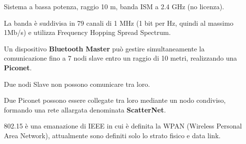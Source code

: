         Sistema a bassa potenza, raggio 10 m, banda ISM a 2.4 GHz (no licenza).

        La banda è suddivisa in 79 canali di 1 MHz (1 bit per Hz, quindi al massimo 1Mb/s) e utilizza Frequency Hopping Spread Spectrum.
        
        Un dispositivo \textbf{Bluetooth Master} può gestire simultaneamente la comunicazione fino a 7 nodi slave entro un raggio di 10 metri, realizzando una \textbf{Piconet}.

        Due nodi Slave non possono comunicare tra loro.

        Due Piconet possono essere collegate tra loro mediante un nodo condiviso, formando una rete allargata denominata \textbf{ScatterNet}.
        
        802.15 è una emanazione di IEEE in cui è definita la WPAN (Wireless Personal Area Network), attualmente sono definiti solo lo strato fisico e data link.